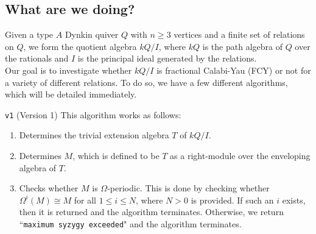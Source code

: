 \documentclass{article}
\begin{document}
\begin{flushleft}
   \begin{center}
   \end{center}

   \subsection*{What are we doing?}
   Given a type $A$ Dynkin quiver $Q$ with $n \geq 3$ vertices and a finite set of relations on $Q$, 
   we form the quotient algebra $kQ/I$, where $kQ$ is the path algebra of $Q$ over the rationals and $I$ 
   is the principal ideal generated by the relations. \\[\baselineskip]

   Our goal is to investigate whether $kQ/I$ is fractional Calabi-Yau (FCY) or not for a variety of different relations.
   To do so, we have a few different algorithms, which will be detailed immediately. \\[\baselineskip]

   \begin{coolbox}{\texttt{v1} (Version 1)}
      This algorithm works as follows:
      \begin{enumerate}[label=\textbf{(\roman*)}]
         \item Determines the trivial extension algebra $T$ of $kQ/I$.
         \item Determines $M$, which is defined to be $T$ as a right-module over the enveloping algebra of $T$.
         \item Checks whether $M$ is $\Omega$-periodic. This is done by checking whether $\Omega^i\left(M\right) \cong M$
            for all $1 \leq i \leq N$, where $N > 0$ is provided. If such an $i$ exists, then it is returned and the algorithm
            terminates. Otherwise, we return ``\texttt{maximum syzygy exceeded}" and the algorithm terminates. 
      \end{enumerate}
   \end{coolbox}


\end{flushleft}
\end{document}
